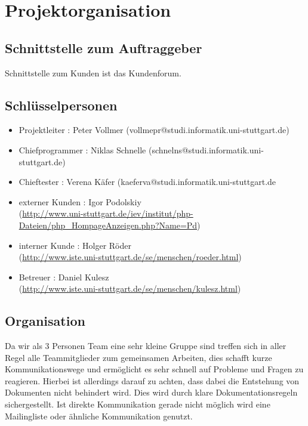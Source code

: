 \documentclass[a4paper,10pt]{scrartcl}
\begin{document}
\section{Projektorganisation}
\subsection{Schnittstelle zum Auftraggeber}
Schnittstelle zum Kunden ist das Kundenforum. 
\subsection{Schlüsselpersonen}
\begin{itemize}
\item
Projektleiter : Peter Vollmer (vollmepr@studi.informatik.uni-stuttgart.de)
\item
Chiefprogrammer : Niklas Schnelle (schnelns@studi.informatik.uni-stuttgart.de)
\item
Chieftester : Verena Käfer (kaeferva@studi.informatik.uni-stuttgart.de
\item
externer Kunden : Igor Podolskiy\\
(\href{http://www.uni-stuttgart.de/iev/institut/php-Dateien/php_HompageAnzeigen.php?Name=Pd}{http://www.uni-stuttgart.de/iev/institut/php-Dateien/php\_HompageAnzeigen.php?Name=Pd})
\item
interner Kunde : Holger Röder\\
(\href{http://www.iste.uni-stuttgart.de/se/menschen/roeder.html}{http://www.iste.uni-stuttgart.de/se/menschen/roeder.html})
\item 
Betreuer : Daniel Kulesz\\
(\href{http://www.iste.uni-stuttgart.de/se/menschen/kulesz.html}{http://www.iste.uni-stuttgart.de/se/menschen/kulesz.html})
\end{itemize}
\subsection{Organisation}
Da wir als 3 Personen Team eine sehr kleine Gruppe sind treffen sich in aller Regel alle Teammitglieder zum gemeinsamen Arbeiten, dies schafft
kurze Kommunikationswege und ermöglicht es sehr schnell auf Probleme und Fragen zu reagieren. Hierbei ist allerdings darauf zu achten, dass
dabei die Entstehung von Dokumenten nicht behindert wird. Dies wird durch klare Dokumentationsregeln sichergestellt.
Ist direkte Kommunikation gerade nicht möglich wird eine Mailingliste oder ähnliche Kommunikation genutzt. 
\end{document}
